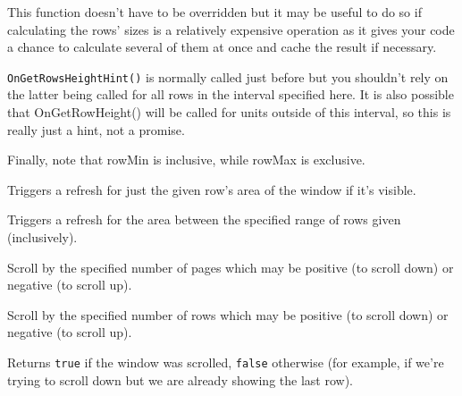 \label{wxvarvscrollhelperongetrowsheighthint}


This function doesn't have to be overridden but it may be useful to do so if
calculating the rows' sizes is a relatively expensive operation as it gives
your code a chance to calculate several of them at once and cache the result
if necessary.

{\tt OnGetRowsHeightHint()} is normally called just before
 but you
shouldn't rely on the latter being called for all rows in the interval
specified here. It is also possible that OnGetRowHeight() will be called for
units outside of this interval, so this is really just a hint, not a promise.

Finally, note that rowMin is inclusive, while rowMax is exclusive.


\label{wxvarvscrollhelperrefreshrow}


Triggers a refresh for just the given row's area of the window if it's visible.


\label{wxvarvscrollhelperrefreshrows}


Triggers a refresh for the area between the specified range of rows given
(inclusively).


\label{wxvarvscrollhelperscrollrowpages}


Scroll by the specified number of pages which may be positive (to scroll down)
or negative (to scroll up).


\label{wxvarvscrollhelperscrollrows}


Scroll by the specified number of rows which may be positive (to scroll down)
or negative (to scroll up).

Returns {\tt true} if the window was scrolled, {\tt false} otherwise (for
example, if we're trying to scroll down but we are already showing the last
row).


